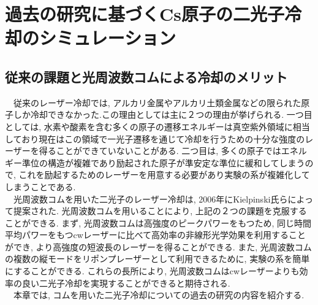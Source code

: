 \documentclass[uplatex, dvipdfmx, a4paper, report, papersize, 11pt]{jsbook}
\begin{document}

\newpage
\chapter{過去の研究に基づくCs原子の二光子冷却のシミュレーション}
\section{従来の課題と光周波数コムによる冷却のメリット}

　従来のレーザー冷却では, アルカリ金属やアルカリ土類金属などの限られた原子しか冷却できなかった.この理由としては主に２つの理由が挙げられる. 一つ目としては, 水素や酸素を含む多くの原子の遷移エネルギーは真空紫外領域に相当しており現在はこの領域で一光子遷移を通じて冷却を行うための十分な強度のレーザーを得ることができていないことがある. 二つ目は, 多くの原子ではエネルギー準位の構造が複雑であり励起された原子が準安定な準位に緩和してしまうので, これを励起するためのレーザーを用意する必要があり実験の系が複雑化してしまうことである\cite{PhysRevA.73.063407}.\\
　光周波数コムを用いた二光子のレーザー冷却は, 2006年にKielpinski氏らによって提案された\cite{PhysRevA.73.063407}. 光周波数コムを用いることにより, 上記の２つの課題を克服することができる. まず, 光周波数コムは高強度のピークパワーをもつため, 同じ時間平均パワーをもつcwレーザーに比べて高効率の非線形光学効果を利用することができ, より高強度の短波長のレーザーを得ることができる. また, 光周波数コムの複数の縦モードをリポンプレーザーとして利用できるために, 実験の系を簡単にすることができる. これらの長所により, 光周波数コムはcwレーザーよりも効率の良い二光子冷却を実現することができると期待される\cite{PhysRevA.73.063407}.\\
　本章では, コムを用いた二光子冷却についての過去の研究の内容を紹介する.
\end{document}
